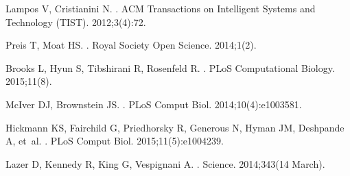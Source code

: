 \documentclass[10pt,letterpaper]{article}
\begin{document}
\begin{thebibliography}{10}
Lampos V, Cristianini N.
.
\newblock ACM Transactions on Intelligent Systems and Technology (TIST).
  2012;3(4):72.

Preis T, Moat HS.
.
\newblock Royal Society Open Science. 2014;1(2).

Brooks L, Hyun S, Tibshirani R, Rosenfeld R.
.
\newblock PLoS Computational Biology. 2015;11(8).

McIver DJ, Brownstein JS.
.
\newblock PLoS Comput Biol. 2014;10(4):e1003581.

Hickmann KS, Fairchild G, Priedhorsky R, Generous N, Hyman JM, Deshpande A,
  et~al.
.
\newblock PLoS Comput Biol. 2015;11(5):e1004239.

Lazer D, Kennedy R, King G, Vespignani A.
.
\newblock Science. 2014;343(14 March).

\end{thebibliography}
\end{document}
